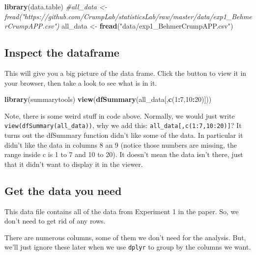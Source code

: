 \documentclass[]{book}
\newenvironment{Shaded}{\begin{snugshade}}{\end{snugshade}}
\newcommand{\KeywordTok}[1]{\textcolor[rgb]{0.13,0.29,0.53}{\textbf{#1}}}
\newcommand{\DecValTok}[1]{\textcolor[rgb]{0.00,0.00,0.81}{#1}}
\newcommand{\StringTok}[1]{\textcolor[rgb]{0.31,0.60,0.02}{#1}}
\newcommand{\CommentTok}[1]{\textcolor[rgb]{0.56,0.35,0.01}{\textit{#1}}}
\newcommand{\OperatorTok}[1]{\textcolor[rgb]{0.81,0.36,0.00}{\textbf{#1}}}
\newcommand{\NormalTok}[1]{#1}
\begin{document}
\begin{Shaded}
\begin{Highlighting}[]
\KeywordTok{library}\NormalTok{(data.table)}
\CommentTok{#all_data <- fread("https://github.com/CrumpLab/statisticsLab/raw/master/data/exp1_BehmerCrumpAPP.csv")}
\NormalTok{all_data <-}\StringTok{ }\KeywordTok{fread}\NormalTok{(}\StringTok{"data/exp1_BehmerCrumpAPP.csv"}\NormalTok{)}
\end{Highlighting}
\end{Shaded}

\subsection{Inspect the dataframe}\label{inspect-the-dataframe-1}

This will give you a big picture of the data frame. Click the button to
view it in your browser, then take a look to see what is in it.

\begin{Shaded}
\begin{Highlighting}[]
\KeywordTok{library}\NormalTok{(summarytools)}
\KeywordTok{view}\NormalTok{(}\KeywordTok{dfSummary}\NormalTok{(all_data[,}\KeywordTok{c}\NormalTok{(}\DecValTok{1}\OperatorTok{:}\DecValTok{7}\NormalTok{,}\DecValTok{10}\OperatorTok{:}\DecValTok{20}\NormalTok{)]))}
\end{Highlighting}
\end{Shaded}

Note, there is some weird stuff in code above. Normally, we would just
write \texttt{view(dfSummary(all\_data))}, why we add this:
\texttt{all\_data{[},c(1:7,10:20){]}}? It turns out the dfSummary
function didn't like some of the data. In particular it didn't like the
data in columns 8 an 9 (notice those numbers are missing, the range
inside c is 1 to 7 and 10 to 20). It doesn't mean the data isn't there,
just that it didn't want to display it in the viewer.

\subsection{Get the data you need}\label{get-the-data-you-need-1}

This data file contains all of the data from Experiment 1 in the paper.
So, we don't need to get rid of any rows.

There are numerous columns, some of them we don't need for the analysis.
But, we'll just ignore these later when we use \texttt{dplyr} to group
by the columns we want.
\end{document}
